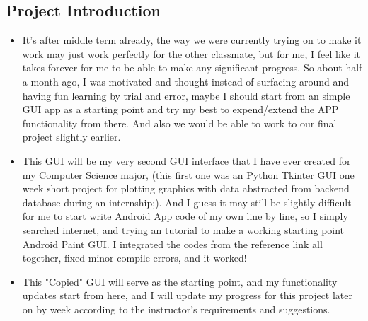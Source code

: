 \documentclass[9pt,b5paper]{article}
\begin{document}
\subsection{Project Introduction}
\label{sec-1-3}
\begin{itemize}
\item It's after middle term already, the way we were currently trying on to make it work may just work perfectly for the other classmate, but for me, I feel like it takes forever for me to be able to make any significant progress. So about half a month ago, I was motivated and thought instead of surfacing around and having fun learning by trial and error, maybe I should start from an simple GUI app as a starting point and try my best to expend/extend the APP functionality from there. And also we would be able to work to our final project slightly earlier.
\item This GUI will be my very second GUI interface that I have ever created for my Computer Science major, (this first one was an Python Tkinter GUI one week short project for plotting graphics with data abstracted from backend database during an internship;). And I guess it may still be slightly difficult for me to start write Android App code of my own line by line, so I simply searched internet, and trying an tutorial to make a working starting point Android Paint GUI. I integrated the codes from the reference link all together, fixed minor compile errors, and it worked!
\item This "Copied" GUI will serve as the starting point, and my functionality updates start from here, and I will update my progress for this project later on by week according to the instructor's requirements and suggestions.
\end{itemize}
\end{document}
